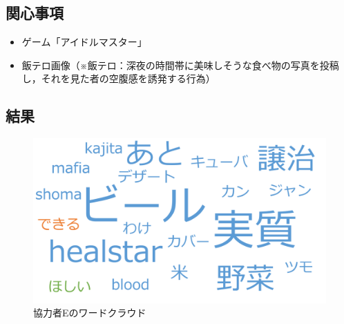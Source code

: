 \subsection{関心事項}
\begin{itemize}
	\item ゲーム「アイドルマスター」
	\item 飯テロ画像（※飯テロ：深夜の時間帯に美味しそうな食べ物の写真を投稿し，それを見た者の空腹感を誘発する行為）
\end{itemize}

\subsection{結果}

\begin{figure}[H]
\centering
\includegraphics[width=13cm]{shimomura_cloud.png}
\caption{協力者Eのワードクラウド}\label{shimomuracloud}
\end{figure}

